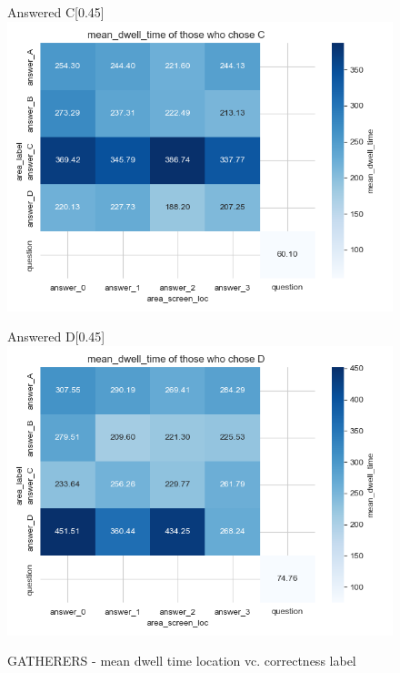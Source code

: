 \documentclass{article}
\begin{document}
\begin{figure}[H]
  \vspace{1em} %

  \begin{subcaptionbox}{Answered C\label{fig:C_dt_g}}[0.45\textwidth]
    {\centering\includegraphics[width=\linewidth]{plots/matrix_plots/matrix_mean_dwell_time_C_gatherers.png}}
  \end{subcaptionbox}
  \hfill
  \begin{subcaptionbox}{Answered D\label{fig:D_dt_g}}[0.45\textwidth]
    {\centering\includegraphics[width=\linewidth]{plots/matrix_plots/matrix_mean_dwell_time_D_gatherers.png}}
  \end{subcaptionbox}
  
  \caption{GATHERERS - mean dwell time location vc. correctness label}
  \label{fig:fourimages4}
\end{figure}
\end{document}
